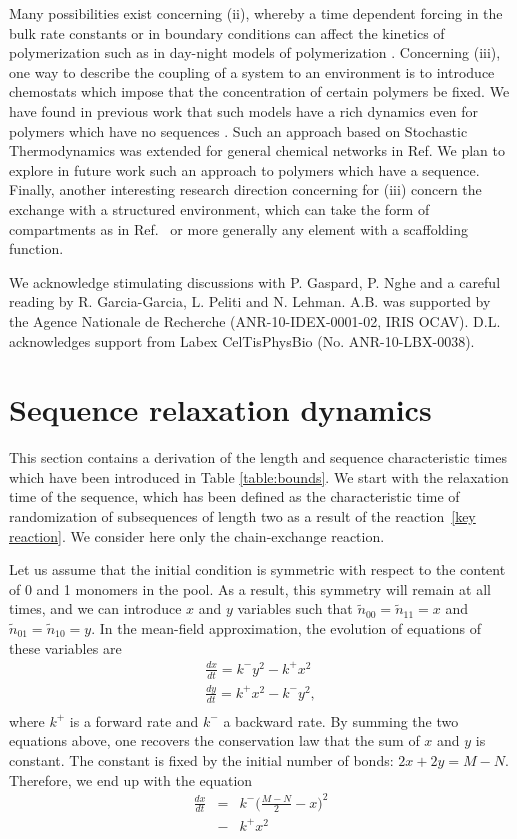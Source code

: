 \documentclass[
	amsmath,
	amssymb,
	a4paper,
	aip,		%
	jcp,		%
	reprint, twocolumn  %
	fleqn,
	showpacs,
	floatfix
]{revtex4-1}
\newcommand{\bea}{\begin{eqnarray}}
\newcommand{\eea}{\end{eqnarray}}
\begin{document}
Many possibilities exist concerning (ii), whereby a time dependent forcing in the bulk rate constants or
in boundary conditions can affect the kinetics of polymerization such as in day-night models of polymerization \cite{Tkachenko2015}.
Concerning (iii), one way to describe the coupling of a system to an environment is to introduce  
chemostats which impose that the concentration of certain polymers be fixed. We have found in previous work that 
such models have a rich dynamics even for polymers which have no sequences \cite{Rao2015a}. 
Such an approach based on Stochastic Thermodynamics was extended for general chemical networks in Ref\cite{Rao2016}. 
We plan to explore in future work such an approach to polymers which have a sequence.
Finally, another interesting research direction concerning for (iii) concern the exchange
with a structured environment, which can take the form of compartments as in Ref.~\cite{Matsumura2016} or more 
generally any element with a scaffolding function.
 
\acknowledgements
We acknowledge stimulating discussions with P. Gaspard, P. Nghe and a
careful reading by R. Garcia-Garcia, L. Peliti and N. Lehman. A.B. was supported by the Agence Nationale de Recherche (ANR-10-IDEX-0001-02, IRIS OCAV).
D.L. acknowledges support from Labex CelTisPhysBio (No. ANR-10-LBX-0038).

\appendix \section{Sequence relaxation dynamics}
\label{app:A}
This section contains a derivation of the length and sequence characteristic times which have been 
introduced in Table \ref{table:bounds}. We start with the relaxation time of the sequence, which
has been defined as the characteristic time of randomization of subsequences of length two
as a result of the reaction~\eqref{key reaction}. We consider here only the chain-exchange reaction.

Let us assume that the initial condition is symmetric with respect to the content of 0 and 
1 monomers in the pool. As a result, this symmetry will remain at all times, 
and we can introduce $x$ and $y$ variables such that 
$\tilde{n}_{00}=\tilde{n}_{11}=x$ and $\tilde{n}_{01}=\tilde{n}_{10}=y$. 
In the mean-field approximation, the evolution of equations of these variables are 
\bea
\frac{dx}{dt}=  k^{-} y^2 - k^{+} x^2  \label{seqrel1} \nonumber \\ \nonumber
\frac{dy}{dt}= k^{+} x^2 - k^{-} y^2, \\
\eea
where $k^{+}$ is a forward rate and $k^{-}$ a backward rate. 
By summing the two equations above, one recovers the conservation law 
that the sum of $x$ and $y$ is constant. The constant is fixed by 
the initial number of bonds: $2x+2y=M-N$. 
Therefore, we end up with the equation
\bea
\frac{d x}{dt}&=&  k^{-} \Big( \frac{M-N}{2} - x \Big)^{2} \label{seqrel2} \nonumber  \\
&-& k^{+}  x^{2}
\eea
 
\end{document}
